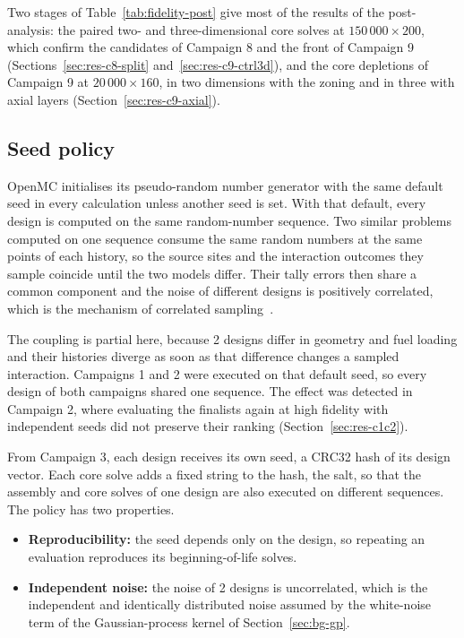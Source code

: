 Two stages of Table~\ref{tab:fidelity-post} give most of the results of
the post-analysis: the paired two- and three-dimensional core solves at
$150\,000\times200$, which confirm the candidates of Campaign 8 and the
front of Campaign 9 (Sections~\ref{sec:res-c8-split}
and~\ref{sec:res-c9-ctrl3d}), and the core depletions of Campaign 9 at
$20\,000\times160$, in two dimensions with the zoning and in three with
axial layers (Section~\ref{sec:res-c9-axial}).


\subsection{Seed policy}
\label{sec:meth-fid-seed}

OpenMC initialises its pseudo-random number generator with the same
default seed in every calculation unless another seed is set. With that
default, every design is computed on the same random-number sequence.
Two similar problems computed on one sequence consume the same random
numbers at the same points of each history, so the source sites and
the interaction outcomes they sample coincide until the two models
differ. Their tally errors then share a common component and the noise
of different designs is positively correlated, which is the mechanism
of correlated sampling~\cite{lux_koblinger_1991}.

The coupling is partial
here, because 2 designs differ in geometry and fuel loading and their
histories diverge as soon as that difference changes a sampled
interaction. Campaigns 1 and 2 were executed on that default seed, so every
design of both campaigns shared one sequence. The effect was detected
in Campaign 2, where evaluating the finalists again at high fidelity with independent seeds did not preserve their ranking
(Section~\ref{sec:res-c1c2}).

From Campaign 3, each design receives its own seed, a CRC32 hash of its
design vector. Each core solve adds a fixed string to the hash, the
salt, so that the assembly and core solves of one design are also executed on
different sequences. The policy has two properties.

\begin{itemize}
  \item \textbf{Reproducibility:} the seed depends only on the design,
        so repeating an evaluation reproduces its beginning-of-life
        solves.

  \item \textbf{Independent noise:} the noise of 2 designs is
        uncorrelated, which is the independent and identically
        distributed noise assumed by the white-noise term of the
        Gaussian-process kernel of Section~\ref{sec:bg-gp}.
\end{itemize}

